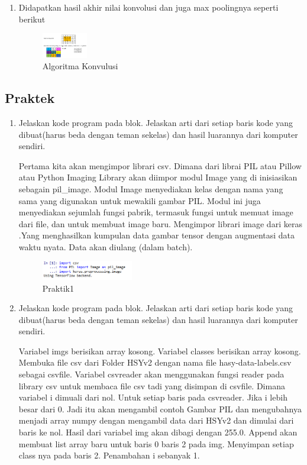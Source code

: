 \begin{enumerate}
	\item Didapatkan hasil akhir nilai konvolusi dan juga max poolingnya seperti berikut
		\begin{figure}[ht]
			\centering
			\includegraphics[width=2cm]{figures/1174008/7/teori13.PNG}
			\caption{Algoritma Konvulusi}
			\label{Teori}
		\end{figure}

\end{enumerate}

\subsection{Praktek}
\begin{enumerate}

\item Jelaskan kode program pada blok. Jelaskan arti dari setiap baris kode yang dibuat(harus beda dengan teman sekelas) dan hasil luarannya dari komputer sendiri.

Pertama kita akan mengimpor librari csv. Dimana dari librai PIL atau Pillow atau Python Imaging Library akan diimpor modul Image yang di inisiasikan sebagain pil\_image. Modul Image menyediakan kelas dengan nama yang sama yang digunakan untuk mewakili gambar PIL. Modul ini juga menyediakan sejumlah fungsi pabrik, termasuk fungsi untuk memuat image dari file, dan untuk membuat image baru. Mengimpor librari image dari keras .Yang menghasilkan kumpulan data gambar tensor dengan augmentasi data waktu nyata. Data akan diulang (dalam batch). 



	\begin{figure}[H]
		\includegraphics[width=4cm]{figures/1174008/7/praktik1.PNG}
            	\centering
           	 \caption{Praktik1}
       	 \end{figure}

\item Jelaskan kode program pada blok. Jelaskan arti dari setiap baris kode yang dibuat(harus beda dengan teman sekelas) dan hasil luarannya dari komputer sendiri.

Variabel imgs berisikan array kosong. Variabel classes berisikan array kosong. Membuka file csv dari Folder HSYv2 dengan nama file hasy-data-labels.csv sebagai csvfile. Variabel csvreader akan menggunakan fungsi reader pada library csv untuk membaca file csv tadi yang disimpan di csvfile. Dimana variabel i dimuali dari nol. Untuk setiap baris pada  csvreader. Jika i lebih besar dari 0. Jadi itu akan mengambil contoh Gambar PIL dan mengubahnya menjadi array numpy dengan mengambil data dari HSYv2 dan dimulai dari baris ke nol. Hasil dari variabel img akan dibagi dengan 255.0. Append akan membuat list array baru untuk baris 0 baris 2 pada img. Menyimpan setiap class nya  pada baris 2. Penambahan i sebanyak 1.


\end{enumerate}
